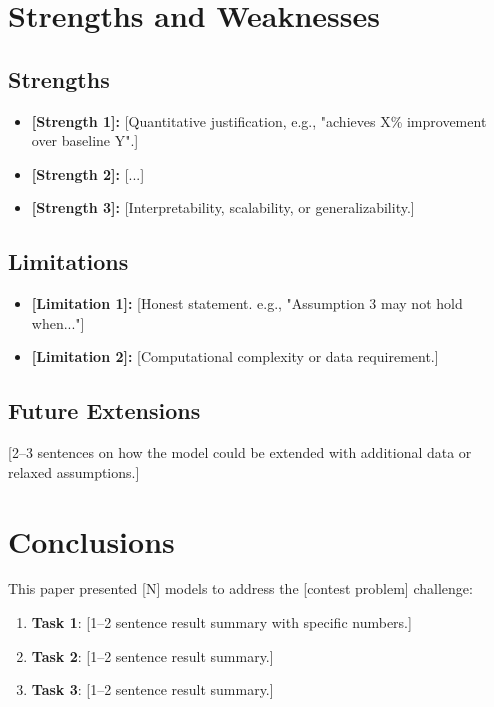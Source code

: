 \documentclass{mcmthesis}
\begin{document}
\section{Strengths and Weaknesses}

\subsection{Strengths}
\begin{itemize}
    \item \textbf{[Strength 1]:} [Quantitative justification, e.g., "achieves X\% improvement over baseline Y".]
    \item \textbf{[Strength 2]:} [...]
    \item \textbf{[Strength 3]:} [Interpretability, scalability, or generalizability.]
\end{itemize}

\subsection{Limitations}
\begin{itemize}
    \item \textbf{[Limitation 1]:} [Honest statement. e.g., "Assumption 3 may not hold when..."]
    \item \textbf{[Limitation 2]:} [Computational complexity or data requirement.]
\end{itemize}

\subsection{Future Extensions}

[2–3 sentences on how the model could be extended with additional data or relaxed assumptions.]

\section{Conclusions}

This paper presented [N] models to address the [contest problem] challenge:

\begin{enumerate}
    \item \textbf{Task 1}: [1–2 sentence result summary with specific numbers.]
    \item \textbf{Task 2}: [1–2 sentence result summary.]
    \item \textbf{Task 3}: [1–2 sentence result summary.]
\end{enumerate}
\end{document}
